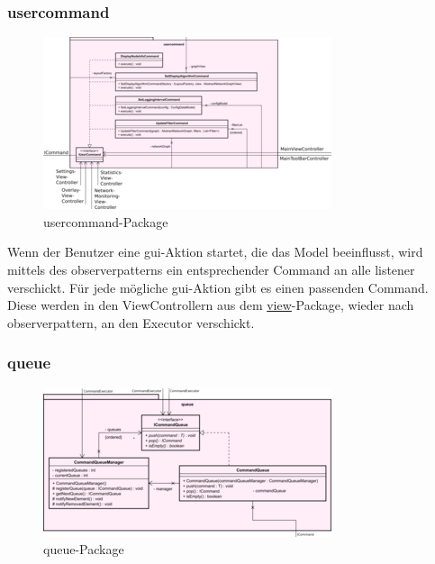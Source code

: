       \subsubsection{usercommand}
      \label{subsubsec:usercommand}

      \begin{figure}[H]
        \centering
        \includegraphics[width=\textwidth]{../diagramimages/usercommand.png}
        \caption{usercommand-Package}
      \end{figure}

      \medskip
      Wenn der Benutzer eine \gls{gui}-Aktion startet, die das Model beeinflusst,
      wird mittels des \gls{observerpattern}s ein entsprechender Command an alle \gls{listener} verschickt. Für jede mögliche
      \gls{gui}-Aktion gibt es einen passenden Command.
      Diese werden in den ViewControllern aus dem \hyperref[subsec:view]{view}-Package, wieder nach \gls{observerpattern},
      an den Executor verschickt.

      \subsubsection{queue}
      \label{subsubsec:queue}

      \begin{figure}[H]
        \centering
        \includegraphics[width=\textwidth]{../diagramimages/queue.png}
        \caption{queue-Package}
      \end{figure}

